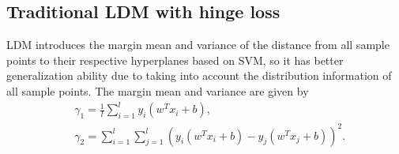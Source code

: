 \documentclass[a4paper]{cas-sc}
\begin{document}

\subsection{Traditional LDM with hinge loss}\label{2.3}
LDM introduces the margin mean and variance of the distance from all sample points to their respective hyperplanes based on SVM, so it has better generalization ability due to taking into account the distribution information of all sample points. The margin mean and variance are given by
\begin{equation} \label{mean}
\begin{aligned}
&\gamma_{1}=\frac{1}{l} \sum_{i=1}^{l} y_{i}\left(w^{T} x_{i}+b\right), \\
&\gamma_{2}=\sum_{i=1}^{l} \sum_{j=1}^{l}\left(y_{i}\left(w^{T} x_{i}+b\right)-y_{j}\left(w^{T} x_{j}+b\right)\right)^{2}.
\end{aligned}
\end{equation}
\end{document}

